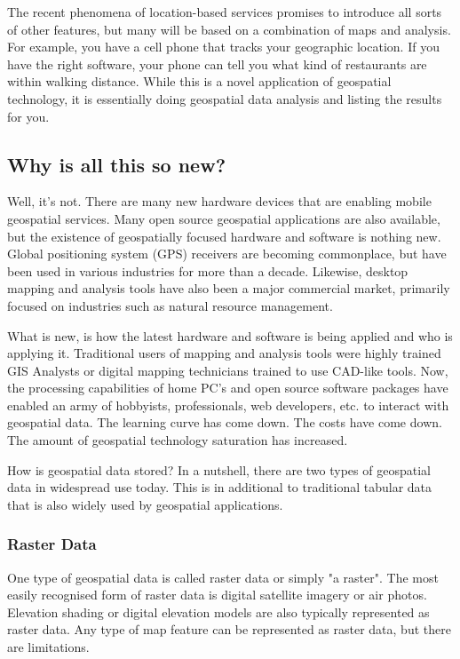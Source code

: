 The recent phenomena of location-based services promises to introduce all
sorts of other features, but many will be based on a combination of maps
and analysis. For example, you have a cell phone that tracks your
geographic location. If you have the right software, your phone can tell
you what kind of restaurants are within walking distance. While this is a
novel application of geospatial technology, it is essentially doing
geospatial data analysis and listing the results for you.

\subsection{Why is all this so new?}\label{label_whynew}

Well, it's not. There are many new hardware devices that are enabling
mobile geospatial services. Many open source geospatial applications are
also available, but the existence of geospatially focused hardware and
software is nothing new. Global positioning system (GPS) receivers are
becoming commonplace, but have been used in various industries for more
than a decade. Likewise, desktop mapping and analysis tools have also been
a major commercial market, primarily focused on industries such as natural
resource management.

What is new, is how the latest hardware and software is being applied and
who is applying it. Traditional users of mapping and analysis tools were
highly trained GIS Analysts or digital mapping technicians trained to use
CAD-like tools. Now, the processing capabilities of home PC's and open
source software packages have enabled an army of hobbyists, professionals,
web developers, etc. to interact with geospatial data. The learning curve
has come down. The costs have come down. The amount of geospatial
technology saturation has increased.

How is geospatial data stored? In a nutshell, there are two types of
geospatial data in widespread use today. This is in additional to
traditional tabular data that is also widely used by geospatial
applications.

\subsubsection{Raster Data}\label{label_rasterdata}

One type of geospatial data is called raster data or simply "a raster". The
most easily recognised form of raster data is digital satellite imagery or
air photos. Elevation shading or digital elevation models are also
typically represented as raster data. Any type of map feature can be
represented as raster data, but there are limitations.

